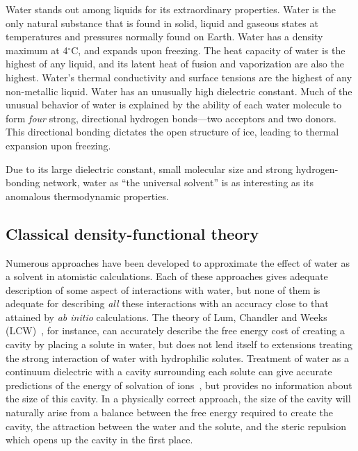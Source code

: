\documentclass[letterpaper,twocolumn,amsmath,amssymb,prb]{revtex4-1}
\newcommand{\needsworknow}[1]{\textcolor{red}{[\emph{#1}]}}
\begin{document}
Water stands out among liquids for its extraordinary properties.  Water is
the only natural substance that is found in solid, liquid and gaseous
states at temperatures and pressures normally found on Earth.  Water has a
density maximum at 4$^\circ$C, and expands upon freezing.  The heat
capacity of water is the highest of any liquid, and its latent heat of
fusion and vaporization are also the highest.  Water's thermal conductivity
and surface tensions are the highest of any non-metallic liquid.  Water has
an unusually high dielectric constant.
Much of the unusual behavior of water is explained by the ability of each
water molecule to form \emph{four} strong, directional hydrogen bonds---two
acceptors and two donors.  This directional bonding dictates the open
structure of ice, leading to thermal expansion upon freezing.

Due to its large dielectric constant, small molecular size and strong
hydrogen-bonding network, water as ``the universal solvent'' is as
interesting as its anomalous thermodynamic properties.

\subsection{Classical density-functional theory}


Numerous approaches have been developed to approximate the effect of water
as a solvent in atomistic calculations.  Each of these approaches gives
adequate description of some aspect of interactions with water, but none of
them is adequate for describing \emph{all} these interactions with an
accuracy close to that attained by \emph{ab initio} calculations.  The
theory of Lum, Chandler and Weeks (LCW)~\cite{lum1999hydrophobicity}, for 
instance, can
accurately describe the free energy cost of creating a cavity by placing a
solute in water, but does not lend itself to extensions treating the strong
interaction of water with hydrophilic solutes.  Treatment of water as a
continuum dielectric with a cavity surrounding each solute can give
accurate predictions of the energy of solvation of ions~\cite{latimer1939,
rashin1985, zhan1998, hsu1999, hildebrandt2004, hildebrandt2007}, but
provides no information about the size of this cavity.  In a physically
correct approach, the size of the cavity will naturally arise from a
balance between the free energy required to create the cavity, the
attraction between the water and the solute, and the steric repulsion which
opens up the cavity in the first place.
\end{document}
